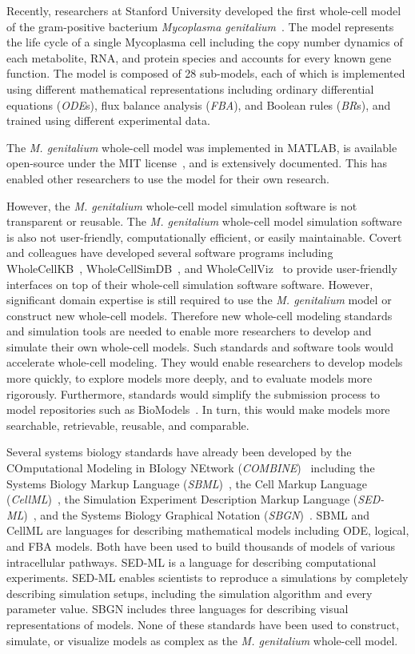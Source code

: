 \documentclass[journal,transmag]{IEEEtran}
\begin{document}
Recently, researchers at Stanford University developed the first whole-cell model of the gram-positive bacterium \textit{Mycoplasma genitalium}~\cite{Karr2012}. The model represents the life cycle of a single Mycoplasma cell including the copy number dynamics of each metabolite, RNA, and protein species and accounts for every known gene function. The model is composed of 28 sub-models, each of which is implemented using different mathematical representations including ordinary differential equations (\emph{ODE}s), flux balance analysis (\emph{FBA}), and Boolean rules (\emph{BR}s), and trained using different experimental data.

The \textit{M. genitalium} whole-cell model was implemented in MATLAB, is available open-source under the MIT license~\cite{wholeCell}, and is extensively documented. This has enabled other researchers to use the model for their own research. 

However, the \textit{M. genitalium} whole-cell model simulation software is not transparent or reusable. The \textit{M. genitalium} whole-cell model simulation software is also not user-friendly, computationally efficient, or easily maintainable. Covert and colleagues have developed several software programs including WholeCellKB~\cite{Karr2013}, WholeCellSimDB~\cite{Karr2014}, and WholeCellViz~\cite{Lee2013} to provide user-friendly interfaces on top of their whole-cell simulation software software. However, significant domain expertise is still required to use the \textit{M. genitalium} model or construct new whole-cell models. Therefore new whole-cell modeling standards and simulation tools are needed to enable more researchers to develop and simulate their own whole-cell models. Such standards and software tools would accelerate whole-cell modeling. They would enable researchers to develop models more quickly, to explore models more deeply, and to evaluate models more rigorously. Furthermore, standards would simplify the submission process to model repositories such as BioModels~\cite{juty2015biomodels,chelliah2015biomodels}. In turn, this would make models more searchable, retrievable, reusable, and comparable.

Several systems biology standards have already been developed by the COmputational Modeling in BIology NEtwork (\emph{COMBINE})~\cite{le2011meeting} including the Systems Biology Markup Language (\emph{SBML})~\cite{hucka2003}, the Cell Markup Language (\emph{CellML})~\cite{hedley_2001b}, the Simulation Experiment Description Markup Language (\emph{SED-ML})~\cite{sedml2011}, and the Systems Biology Graphical Notation (\emph{SBGN})~\cite{LeNovereHMMSS09}. SBML and CellML are languages for describing mathematical models including ODE, logical, and FBA models. Both have been used to build thousands of models of various intracellular pathways. SED-ML is a language for describing computational experiments. SED-ML enables scientists to reproduce a simulations by completely describing simulation setups, including the simulation algorithm and every parameter value. SBGN includes three languages for describing visual representations of models. None of these standards have been used to construct, simulate, or visualize models as complex as the \textit{M. genitalium} whole-cell model.
\end{document}
